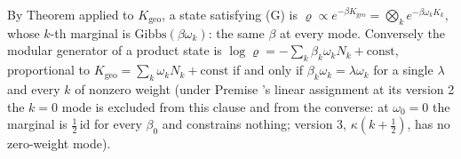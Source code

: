 By Theorem  applied to $K_{\mathrm{geo}}$, a state satisfying (G) is $\varrho \propto e^{-\beta K_{\mathrm{geo}}} = \bigotimes_k e^{-\beta\omega_k K_k}$, whose $k$-th marginal is $\mathrm{Gibbs}(\beta\omega_k)$: the same $\beta$ at every mode. Conversely the modular generator of a product state is $\log\varrho = -\sum_k \beta_k\omega_k N_k + \mathrm{const}$, proportional to $K_{\mathrm{geo}} = \sum_k \omega_k N_k + \mathrm{const}$ if and only if $\beta_k\omega_k = \lambda\omega_k$ for a single $\lambda$ and every $k$ of nonzero weight (under Premise 's linear assignment at its version 2 the $k = 0$ mode is excluded from this clause and from the converse: at $\omega_0 = 0$ the marginal is $\tfrac12\,\mathrm{id}$ for every $\beta_0$ and constrains nothing; version 3, $\kappa(k + \tfrac12)$, has no zero-weight mode).

